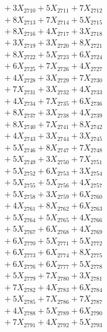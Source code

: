 \documentclass[a4paper,10pt]{article}
\begin{document}
{\begin{align}
&\;  + 3 X_{2710} + 5 X_{2711} + 7 X_{2712} \\[0.3ex]
&\;  + 8 X_{2713} + 7 X_{2714} + 5 X_{2715} \\[0.3ex]
&\;  + 8 X_{2716} + 4 X_{2717} + 3 X_{2718} \\[0.3ex]
&\;  + 3 X_{2719} + 3 X_{2720} + 8 X_{2721} \\[0.3ex]
&\;  + 8 X_{2722} + 5 X_{2723} + 6 X_{2724} \\[0.3ex]
&\;  + 6 X_{2725} + 7 X_{2726} + 4 X_{2727} \\[0.3ex]
&\;  + 4 X_{2728} + 3 X_{2729} + 7 X_{2730} \\[0.3ex]
&\;  + 7 X_{2731} + 3 X_{2732} + 4 X_{2733} \\[0.3ex]
&\;  + 4 X_{2734} + 7 X_{2735} + 6 X_{2736} \\[0.3ex]
&\;  + 8 X_{2737} + 3 X_{2738} + 4 X_{2739} \\[0.5ex]\allowbreak
&\;  + 8 X_{2740} + 7 X_{2741} + 8 X_{2742} \\[0.3ex]
&\;  + 4 X_{2743} + 3 X_{2744} + 3 X_{2745} \\[0.3ex]
&\;  + 5 X_{2746} + 8 X_{2747} + 7 X_{2748} \\[0.3ex]
&\;  + 5 X_{2749} + 3 X_{2750} + 7 X_{2751} \\[0.3ex]
&\;  + 5 X_{2752} + 6 X_{2753} + 3 X_{2754} \\[0.3ex]
&\;  + 5 X_{2755} + 5 X_{2756} + 4 X_{2757} \\[0.3ex]
&\;  + 5 X_{2758} + 3 X_{2759} + 6 X_{2760} \\[0.3ex]
&\;  + 4 X_{2761} + 8 X_{2762} + 6 X_{2763} \\[0.3ex]
&\;  + 5 X_{2764} + 5 X_{2765} + 4 X_{2766} \\[0.3ex]
&\;  + 5 X_{2767} + 6 X_{2768} + 4 X_{2769} \\[0.5ex]\allowbreak
&\;  + 6 X_{2770} + 5 X_{2771} + 5 X_{2772} \\[0.3ex]
&\;  + 6 X_{2773} + 6 X_{2774} + 8 X_{2775} \\[0.3ex]
&\;  + 6 X_{2776} + 6 X_{2777} + 5 X_{2778} \\[0.3ex]
&\;  + 5 X_{2779} + 7 X_{2780} + 3 X_{2781} \\[0.3ex]
&\;  + 7 X_{2782} + 4 X_{2783} + 6 X_{2784} \\[0.3ex]
&\;  + 5 X_{2785} + 7 X_{2786} + 7 X_{2787} \\[0.3ex]
&\;  + 4 X_{2788} + 5 X_{2789} + 6 X_{2790} \\[0.3ex]
&\;  + 7 X_{2791} + 4 X_{2792} + 5 X_{2793} \\[0.3ex]

\end{align}}
\end{document}
